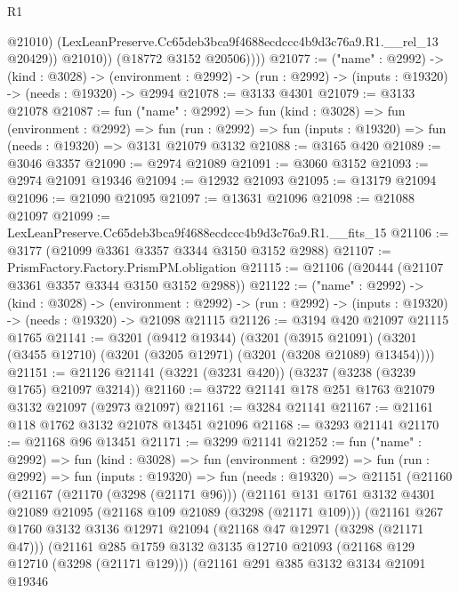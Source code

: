 \begin{lexlean}{R1}
\begin{coremodule}
                  @21010)
                (LexLeanPreserve.Cc65deb3bca9f4688ecdccc4b9d3c76a9.R1.__rel_13 @20429))
              @21010))
          (@18772 @3152 @20506))))
@21077 := ("name" : @2992) ->
  (kind : @3028) ->
  (environment : @2992) -> (run : @2992) -> (inputs : @19320) -> (needs : @19320) -> @2994
@21078 := @3133 @4301
@21079 := @3133 @21078
@21087 := fun ("name" : @2992) =>
  fun (kind : @3028) =>
  fun (environment : @2992) =>
  fun (run : @2992) => fun (inputs : @19320) => fun (needs : @19320) => @3131 @21079 @3132
@21088 := @3165 @420
@21089 := @3046 @3357
@21090 := @2974 @21089
@21091 := @3060 @3152
@21093 := @2974 @21091 @19346
@21094 := @12932 @21093
@21095 := @13179 @21094
@21096 := @21090 @21095
@21097 := @13631 @21096
@21098 := @21088 @21097
@21099 := LexLeanPreserve.Cc65deb3bca9f4688ecdccc4b9d3c76a9.R1.__fits_15
@21106 := @3177 (@21099 @3361 @3357 @3344 @3150 @3152 @2988)
@21107 := PrismFactory.Factory.PrismPM.obligation
@21115 := @21106 (@20444 (@21107 @3361 @3357 @3344 @3150 @3152 @2988))
@21122 := ("name" : @2992) ->
  (kind : @3028) ->
  (environment : @2992) -> (run : @2992) -> (inputs : @19320) -> (needs : @19320) -> @21098 @21115
@21126 := @3194 @420 @21097 @21115 @1765
@21141 := @3201
    (@9412 @19344)
    (@3201
      (@3915 @21091)
      (@3201 (@3455 @12710) (@3201 (@3205 @12971) (@3201 (@3208 @21089) @13454))))
@21151 := @21126 @21141 (@3221 (@3231 @420)) (@3237 (@3238 (@3239 @1765) @21097 @3214))
@21160 := @3722 @21141 @178 @251 @1763 @21079 @3132 @21097 (@2973 @21097)
@21161 := @3284 @21141
@21167 := @21161 @118 @1762 @3132 @21078 @13451 @21096
@21168 := @3293 @21141
@21170 := @21168 @96 @13451
@21171 := @3299 @21141
@21252 := fun ("name" : @2992) =>
  fun (kind : @3028) =>
  fun (environment : @2992) =>
  fun (run : @2992) =>
  fun (inputs : @19320) =>
  fun (needs : @19320) =>
  @21151
    (@21160
      (@21167
        (@21170 (@3298 (@21171 @96)))
        (@21161
          @131
          @1761
          @3132
          @4301
          @21089
          @21095
          (@21168 @109 @21089 (@3298 (@21171 @109)))
          (@21161
            @267
            @1760
            @3132
            @3136
            @12971
            @21094
            (@21168 @47 @12971 (@3298 (@21171 @47)))
            (@21161
              @285
              @1759
              @3132
              @3135
              @12710
              @21093
              (@21168 @129 @12710 (@3298 (@21171 @129)))
              (@21161
                @291
                @385
                @3132
                @3134
                @21091
                @19346

\end{coremodule}
\end{lexlean}
